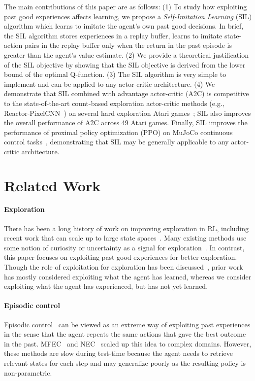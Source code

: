 \documentclass{article}
\newcommand{\cutsectionup}{\vspace*{-0.08in}}\newcommand{\cutsectiondown}{\vspace*{-0.05in}}
\newcommand{\cutparagraphup}{\vspace*{-0.05in}}\newcommand{\cutparagraphdown}{\vspace*{-0.02in}}
\begin{document}
The main contributions of this paper are as follows: (1) To study how exploiting past good experiences affects learning, we propose a \textit{Self-Imitation Learning} (SIL) algorithm which learns to imitate the agent's own past good decisions. In brief, the SIL algorithm stores experiences in a replay buffer, learns to imitate state-action pairs in the replay buffer only when the return in the past episode is greater than the agent's value estimate. (2) We provide a theoretical justification of the SIL objective by showing that the SIL objective is derived from the lower bound of the optimal Q-function. (3) The SIL algorithm is very simple to implement and can be applied to any actor-critic architecture. (4) We demonstrate that SIL combined with advantage actor-critic (A2C) is competitive to the state-of-the-art count-based exploration actor-critic methods (e.g., Reactor-PixelCNN~\citep{ostrovski2017count}) on several hard exploration Atari games~\citep{bellemare13arcade}; SIL also improves the overall performance of A2C across 49 Atari games. Finally, SIL improves the performance of proximal policy optimization (PPO) on MuJoCo continuous control tasks~\citep{brockman2016openai,Todorov2012MuJoCoAP}, demonstrating that SIL may be generally applicable to any actor-critic architecture.

\cutsectionup
\section{Related Work} \label{sec:related-work}
\cutsectiondown

\paragraph{Exploration}
There has been a long history of work on improving exploration in RL, including recent work that can scale up to large state spaces~\cite{stadie2015incentivizing,osband2016deep,bellemare2016unifying,ostrovski2017count}. Many existing methods use some notion of curiosity or uncertainty as a signal for exploration~\citep{Schmidhuber1991AdaptiveCA,strehl2008analysis}. 
In contrast, this paper focuses on exploiting past good experiences for better exploration. Though the role of exploitation for exploration has been discussed~\citep{thrun1992therole}, prior work has mostly considered exploiting what the agent has learned, whereas we consider exploiting what the agent has experienced, but has not yet learned.

\cutparagraphup
\paragraph{Episodic control}
Episodic control~\citep{lengyel2008hippocampal} can be viewed as an extreme way of exploiting past experiences in the sense that the agent repeats the same actions that gave the best outcome in the past. MFEC~\citep{blundell2016model} and NEC~\citep{pritzel2017neural} scaled up this idea to complex domains. However, these methods are slow during test-time because the agent needs to retrieve relevant states for each step and may generalize poorly as the resulting policy is non-parametric.
\end{document}
